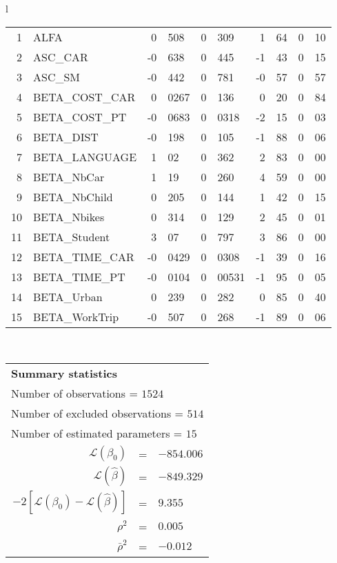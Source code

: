 \begin{tabular}{l}
\begin{tabular}{rlr@{.}lr@{.}lr@{.}lr@{.}l}
1 & ALFA & 0&508 & 0&309 & 1&64 & 0&10\\
2 & ASC_CAR & -0&638 & 0&445 & -1&43 & 0&15\\
3 & ASC_SM & -0&442 & 0&781 & -0&57 & 0&57\\
4 & BETA_COST_CAR & 0&0267 & 0&136 & 0&20 & 0&84\\
5 & BETA_COST_PT & -0&0683 & 0&0318 & -2&15 & 0&03\\
6 & BETA_DIST & -0&198 & 0&105 & -1&88 & 0&06\\
7 & BETA_LANGUAGE & 1&02 & 0&362 & 2&83 & 0&00\\
8 & BETA_NbCar & 1&19 & 0&260 & 4&59 & 0&00\\
9 & BETA_NbChild & 0&205 & 0&144 & 1&42 & 0&15\\
10 & BETA_Nbikes & 0&314 & 0&129 & 2&45 & 0&01\\
11 & BETA_Student & 3&07 & 0&797 & 3&86 & 0&00\\
12 & BETA_TIME_CAR & -0&0429 & 0&0308 & -1&39 & 0&16\\
13 & BETA_TIME_PT & -0&0104 & 0&00531 & -1&95 & 0&05\\
14 & BETA_Urban & 0&239 & 0&282 & 0&85 & 0&40\\
15 & BETA_WorkTrip & -0&507 & 0&268 & -1&89 & 0&06\\
\hline
\end{tabular}
\\
\begin{tabular}{rcl}
\multicolumn{3}{l}{\bf Summary statistics}\\
\multicolumn{3}{l}{ Number of observations = $1524$} \\
\multicolumn{3}{l}{ Number of excluded observations = $514$} \\
\multicolumn{3}{l}{ Number of estimated  parameters = $15$} \\
 $\mathcal{L}(\beta_0)$ &=&  $-854.006$ \\
 $\mathcal{L}(\hat{\beta})$ &=& $-849.329 $  \\
 $-2[\mathcal{L}(\beta_0) -\mathcal{L}(\hat{\beta})]$ &=& $9.355$ \\
    $\rho^2$ &=&   $0.005$ \\
    $\bar{\rho}^2$ &=&    $-0.012$ \\
\end{tabular}
  \end{tabular}
